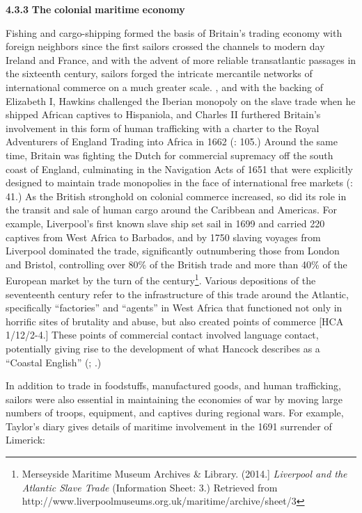 \textbf{4.3.3} \textbf{The} \textbf{colonial} \textbf{maritime} \textbf{economy}

  Fishing and cargo-shipping formed the basis of Britain’s trading economy with foreign neighbors since the first sailors crossed the channels to modern day Ireland and France, and with the advent of more reliable transatlantic passages in the sixteenth century, sailors forged the intricate mercantile networks of international commerce on a much greater scale. \citealt{In1562}, and with the backing of Elizabeth I, Hawkins challenged the Iberian monopoly on the slave trade when he shipped African captives to Hispaniola, and Charles II furthered Britain’s involvement in this form of human trafficking with a charter to the Royal Adventurers of England Trading into Africa in 1662 (\citealt{Brown2011}: 105.) Around the same time, Britain was fighting the Dutch for commercial supremacy off the south coast of England, culminating in the Navigation Acts of 1651 that were explicitly designed to maintain trade monopolies in the face of international free markets (\citealt{Brown2011}: 41.) As the British stronghold on colonial commerce increased, so did its role in the transit and sale of human cargo around the Caribbean and Americas. For example, Liverpool’s first known slave ship set sail in 1699 and carried 220 captives from West Africa to Barbados, and by 1750 slaving voyages from Liverpool dominated the trade, significantly outnumbering those from London and Bristol, controlling over 80\% of the British trade and more than 40\% of the European market by the turn of the century\footnote{Merseyside Maritime Museum Archives \& Library. (2014.] \textit{Liverpool and the Atlantic Slave Trade} (Information Sheet: 3.) Retrieved from http://www.liverpoolmuseums.org.uk/maritime/archive/sheet/3}. Various depositions of the seventeenth century refer to the infrastructure of this trade around the Atlantic, specifically “factories” and “agents” in West Africa that functioned not only in horrific sites of brutality and abuse, but also created points of commerce [HCA 1/12/2-4.] These points of commercial contact involved language contact, potentially giving rise to the development of what Hancock describes as a “Coastal English” (\citealt{Hancock1986}; \citealt{DelgadoHancock2017}.)

In addition to trade in foodstuffs, manufactured goods, and human trafficking, sailors were also essential in maintaining the economies of war by moving large numbers of troops, equipment, and captives during regional wars. For example, Taylor’s diary gives details of maritime involvement in the 1691 surrender of Limerick:

